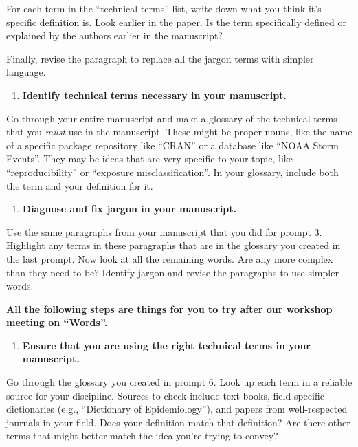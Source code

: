 \documentclass[]{tufte-book}
\providecommand{\tightlist}{%
  \setlength{\itemsep}{0pt}\setlength{\parskip}{0pt}}
\begin{document}
For each term in the ``technical terms'' list, write down what you think it's
specific definition is. Look earlier in the paper. Is the term specifically
defined or explained by the authors earlier in the manuscript?

Finally, revise the paragraph to replace all the jargon terms with simpler language.

\begin{enumerate}
\def\labelenumi{\arabic{enumi}.}
\setcounter{enumi}{5}
\tightlist
\item
  \textbf{Identify technical terms necessary in your manuscript.}
\end{enumerate}

Go through your entire manuscript and make a glossary of the technical terms
that you \emph{must} use in the manuscript. These might be proper nouns, like the
name of a specific package repository like ``CRAN'' or a database like ``NOAA Storm
Events''. They may be ideas that are very specific to your topic, like
``reproducibility'' or ``exposure misclassification''. In your glossary, include
both the term and your definition for it.

\begin{enumerate}
\def\labelenumi{\arabic{enumi}.}
\setcounter{enumi}{6}
\tightlist
\item
  \textbf{Diagnose and fix jargon in your manuscript.}
\end{enumerate}

Use the same paragraphs from your manuscript that you did for prompt 3.
Highlight any terms in these paragraphs that are in the glossary you created in
the last prompt. Now look at all the remaining words. Are any more complex than
they need to be? Identify jargon and revise the paragraphs to use simpler words.

\textbf{All the following steps are things for you to try after our workshop
meeting on ``Words''.}

\begin{enumerate}
\def\labelenumi{\arabic{enumi}.}
\setcounter{enumi}{7}
\tightlist
\item
  \textbf{Ensure that you are using the right technical terms in your manuscript.}
\end{enumerate}

Go through the glossary you created in prompt 6. Look up each term in a reliable
source for your discipline. Sources to check include text books, field-specific
dictionaries (e.g., ``Dictionary of Epidemiology''), and papers from well-respected
journals in your field. Does your definition match that definition? Are there
other terms that might better match the idea you're trying to convey?
\end{document}
